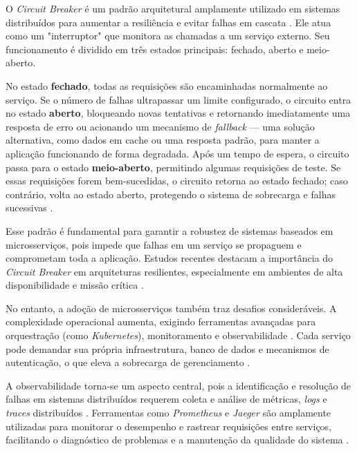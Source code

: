 O \textit{Circuit Breaker} é um padrão arquitetural amplamente utilizado em sistemas distribuídos para aumentar a resiliência e evitar falhas em cascata \cite{Nair2019CircuitBreaker, Fowler2012CircuitBreaker}. Ele atua como um "interruptor" que monitora as chamadas a um serviço externo. Seu funcionamento é dividido em três estados principais: fechado, aberto e meio-aberto.

No estado \textbf{fechado}, todas as requisições são encaminhadas normalmente ao serviço. Se o número de falhas ultrapassar um limite configurado, o circuito entra no estado \textbf{aberto}, bloqueando novas tentativas e retornando imediatamente uma resposta de erro ou acionando um mecanismo de \textit{fallback} — uma solução alternativa, como dados em cache ou uma resposta padrão, para manter a aplicação funcionando de forma degradada. Após um tempo de espera, o circuito passa para o estado \textbf{meio-aberto}, permitindo algumas requisições de teste. Se essas requisições forem bem-sucedidas, o circuito retorna ao estado fechado; caso contrário, volta ao estado aberto, protegendo o sistema de sobrecarga e falhas sucessivas \cite{Nair2019CircuitBreaker, Fowler2012CircuitBreaker}.

Esse padrão é fundamental para garantir a robustez de sistemas baseados em microsserviços, pois impede que falhas em um serviço se propaguem e comprometam toda a aplicação. Estudos recentes destacam a importância do \textit{Circuit Breaker} em arquiteturas resilientes, especialmente em ambientes de alta disponibilidade e missão crítica \cite{Nair2019CircuitBreaker}. 

No entanto, a adoção de microsserviços também traz desafios consideráveis. A complexidade operacional aumenta, exigindo ferramentas avançadas para orquestração (como \textit{Kubernetes}), monitoramento e observabilidade \cite{jamshidi2016systematic, shekhar2023microservices}. Cada serviço pode demandar sua própria infraestrutura, banco de dados e mecanismos de autenticação, o que eleva a sobrecarga de gerenciamento \cite{nizami2020comparison}.

A observabilidade torna-se um aspecto central, pois a identificação e resolução de falhas em sistemas distribuídos requerem coleta e análise de métricas, \textit{logs} e \textit{traces} distribuídos \cite{observability2023, sha2023automating}. Ferramentas como \textit{Prometheus} e \textit{Jaeger} são amplamente utilizadas para monitorar o desempenho e rastrear requisições entre serviços, facilitando o diagnóstico de problemas e a manutenção da qualidade do sistema \cite{ahmed2022observability}. 

